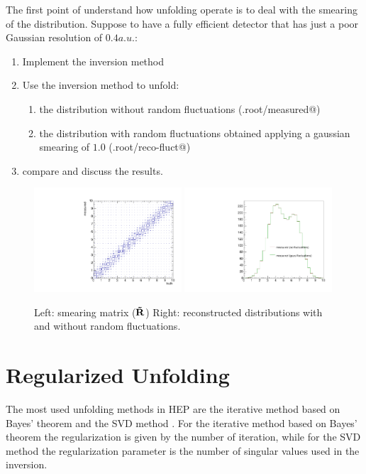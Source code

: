 \documentclass[a4paper,11pt]{article}
\begin{document}
The first point of understand how unfolding operate is to deal with the smearing of the distribution.
Suppose to have a fully efficient detector that has just a poor Gaussian resolution of $0.4 a.u.$:
\begin{enumerate}
	\item Implement the inversion method 
	\item Use the inversion method to unfold:
	\begin{enumerate}
		\item the distribution without random fluctuations (\verb@Exe.root/measured@)
		\item the distribution with random fluctuations obtained applying a gaussian smearing of $1.0$ (\verb@Exe.root/reco-fluct@)
	\end{enumerate}
	\item compare and discuss the results.
\end{enumerate}
\begin{figure}[H]
	\includegraphics[width=0.49\textwidth]{figs/respt.pdf}
	\includegraphics[width=0.49\textwidth]{figs/reco.pdf}
	\caption{
		\label{fig:exe1}
		Left: smearing matrix ($\mathbf{\tilde{R}}$) 
		Right: reconstructed distributions with and without random fluctuations.
	}	
\end{figure}
\FloatBarrier

\section{Regularized Unfolding}

The most used unfolding methods in \gls{HEP} are the iterative method based on Bayes' theorem \cite{dAgostini} and the \gls{SVD} method \cite{SVD}.
For the iterative method based on Bayes' theorem the regularization is given by the number of iteration, while for the \gls{SVD} method the regularization parameter is the number of singular values used in the inversion.
\end{document}

